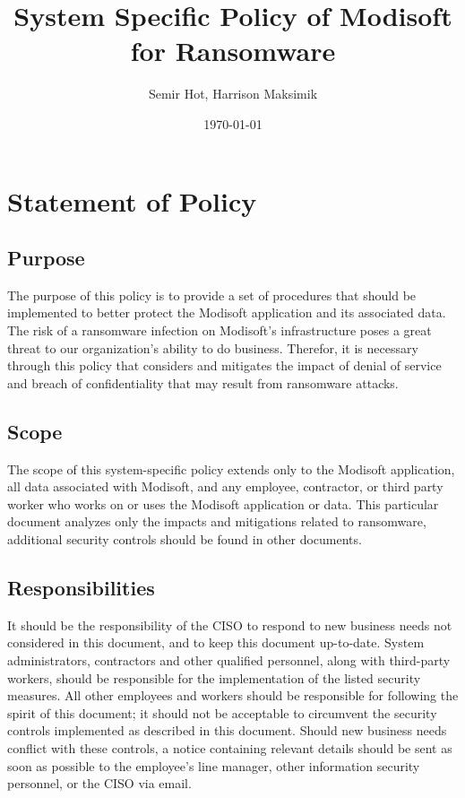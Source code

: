 \documentclass[11pt]{article}
\author{Semir Hot, Harrison Maksimik}
\date{\today}
\title{System Specific Policy of Modisoft for Ransomware}
\begin{document}
\maketitle
\tableofcontents

\section{Statement of Policy}
\label{sec:org89b5d26}
\subsection{Purpose}
\label{sec:org9c6e13a}
The purpose of this policy is to provide a set of procedures that should be implemented to better protect the Modisoft application and its associated data. The risk of a ransomware infection on Modisoft's infrastructure poses a great threat to our organization's ability to do business. Therefor, it is necessary through this policy that considers and mitigates the impact of denial of service and breach of confidentiality that may result from ransomware attacks.

\subsection{Scope}
\label{sec:org56ac193}
The scope of this system-specific policy extends only to the Modisoft application, all data associated with Modisoft, and any employee, contractor, or third party worker who works on or uses the Modisoft application or data. This particular document analyzes only the impacts and mitigations related to ransomware, additional security controls should be found in other documents.

\subsection{Responsibilities}
\label{sec:orgf6e41d9}
It should be the responsibility of the CISO to respond to new business needs not considered in this document, and to keep this document up-to-date. System administrators, contractors and other qualified personnel, along with third-party workers, should be responsible for the implementation of the listed security measures. All other employees and workers should be responsible for following the spirit of this document; it should not be acceptable to circumvent the security controls implemented as described in this document. Should new business needs conflict with these controls, a notice containing relevant details should be sent as soon as possible to the employee's line manager, other information security personnel, or the CISO via email.
\end{document}
